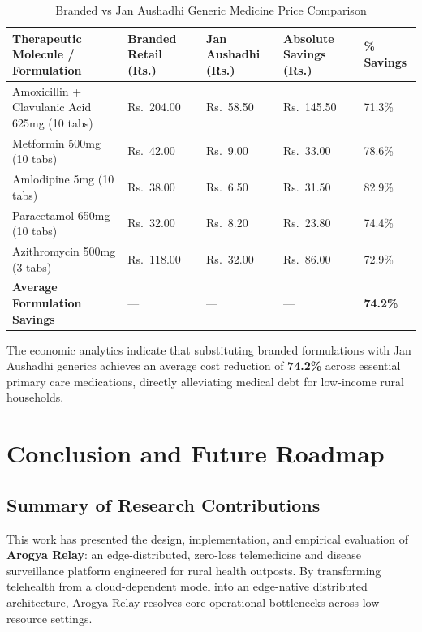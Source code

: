 \documentclass[12pt,a4paper,oneside]{report}
\begin{document}
\begin{table}[!htbp]
\centering
\small
\renewcommand{\arraystretch}{1.3}
\begin{tabularx}{\textwidth}{Y C{2.2cm} C{2.2cm} C{2.2cm} C{1.8cm}}
\toprule
\textbf{Therapeutic Molecule / Formulation} & \textbf{Branded Retail (Rs.)} & \textbf{Jan Aushadhi (Rs.)} & \textbf{Absolute Savings (Rs.)} & \textbf{\% Savings} \\
\midrule
Amoxicillin + Clavulanic Acid 625mg (10 tabs) & Rs.~204.00 & Rs.~58.50 & Rs.~145.50 & 71.3\% \\
Metformin 500mg (10 tabs) & Rs.~42.00 & Rs.~9.00 & Rs.~33.00 & 78.6\% \\
Amlodipine 5mg (10 tabs) & Rs.~38.00 & Rs.~6.50 & Rs.~31.50 & 82.9\% \\
Paracetamol 650mg (10 tabs) & Rs.~32.00 & Rs.~8.20 & Rs.~23.80 & 74.4\% \\
Azithromycin 500mg (3 tabs) & Rs.~118.00 & Rs.~32.00 & Rs.~86.00 & 72.9\% \\
\midrule
\textbf{Average Formulation Savings} & --- & --- & --- & \textbf{74.2\%} \\
\bottomrule
\end{tabularx}
\caption{Branded vs Jan Aushadhi Generic Medicine Price Comparison}
\label{tab:price_comparison}
\end{table}

The economic analytics indicate that substituting branded formulations with Jan Aushadhi generics achieves an average cost reduction of \textbf{74.2\%} across essential primary care medications, directly alleviating medical debt for low-income rural households.

\chapter{Conclusion and Future Roadmap}

\section{Summary of Research Contributions}
This work has presented the design, implementation, and empirical evaluation of \textbf{Arogya Relay}: an edge-distributed, zero-loss telemedicine and disease surveillance platform engineered for rural health outposts. By transforming telehealth from a cloud-dependent model into an edge-native distributed architecture, Arogya Relay resolves core operational bottlenecks across low-resource settings.
\end{document}
